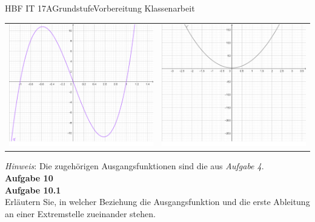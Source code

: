 \documentclass[oneside,openany,headings=optiontotoc,11pt,numbers=noenddot]{scrreprt}
\begin{document}
\begin{worksheet}{HBF IT 17A}{Grundstufe}{Vorbereitung Klassenarbeit}
\begin{framed}
\begin{tabularx}{\textwidth}{X|X}
				\includegraphics[scale=0.25]{Bilder/KAUebungBilder/q2.png} & \includegraphics[scale=0.25]{Bilder/KAUebungBilder/s2.png}\\
			\end{tabularx}
			\textit{Hinweis}: Die zugehörigen Ausgangsfunktionen sind die aus \textit{Aufgabe 4}.\\
			\newpage\noindent
			\textbf{Aufgabe 10}\\
			\indent \textbf{Aufgabe 10.1}\\
			Erläutern Sie, in welcher Beziehung die Ausgangsfunktion und die erste Ableitung an einer Extremstelle zueinander stehen.\\

\end{framed}
\end{worksheet}
\end{document}
